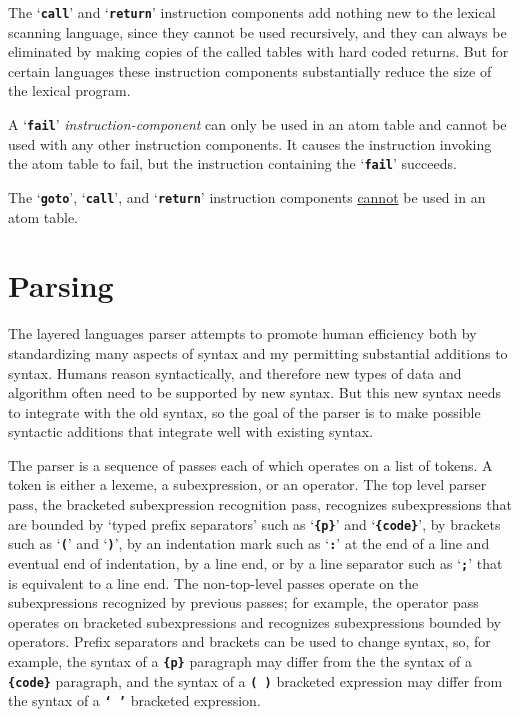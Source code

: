 \documentclass[12pt]{article}
\makeatletter
\newcommand{\TT}[1]{{\tt \bfseries #1}}
\newcommand{\ttmkey}[2]{\TT{#1}\index{#1@{\tt #1}!#2}}
\makeatother
\begin{document}
The `\TT{call}' and `\TT{return}' instruction components
add nothing new to the lexical scanning language, since they
cannot be used recursively,
and they can always be eliminated by making
copies of the called tables with hard coded returns.
But for certain languages these instruction components
substantially reduce the size of the lexical program.

A `\ttmkey{fail}{in lexical program}'
{\em instruction-component} can only be used in an atom
table and cannot be used with any other instruction components.
It causes the instruction invoking the atom table to fail, but
the instruction containing the `\TT{fail}' succeeds.

The `\TT{goto}', `\TT{call}', and `\TT{return}' instruction components
\underline{cannot} be used in an atom table.

\section{Parsing}

The layered languages parser attempts to promote human efficiency
both by standardizing many aspects of syntax and my permitting
substantial additions to syntax.  Humans reason
syntactically, and therefore new types of data and algorithm often
need to be supported by new syntax.  But this new syntax needs to
integrate with the old syntax, so the goal of the parser is to make
possible syntactic additions that integrate well with existing syntax.

The parser is a sequence of passes each of which operates on a list
of tokens.  A token is either a lexeme, a subexpression, or an operator.
The top level parser pass, the bracketed subexpression recognition pass,
recognizes subexpressions that are bounded by `typed prefix separators' such as
`\TT{\{p\}}' and `\TT{\{code\}}', by brackets
such as `\TT{(}' and `\TT{)}', by an indentation mark such as `\TT{:}'
at the end of a line and eventual
end of indentation, by a line end, or by a line separator such as `\TT{;}'
that is equivalent to a line end.
The non-top-level passes
operate on the subexpressions recognized by previous passes;
for example, the operator pass operates on bracketed subexpressions
and recognizes
subexpressions bounded by operators.
Prefix separators and brackets can be used to change syntax, so, for example,
the syntax of a \TT{\{p\}} paragraph may differ from the
the syntax of a \TT{\{code\}} paragraph, and
the syntax of a \TT{( )} bracketed expression may differ from
the syntax of a \TT{` '} bracketed expression.
\end{document}
